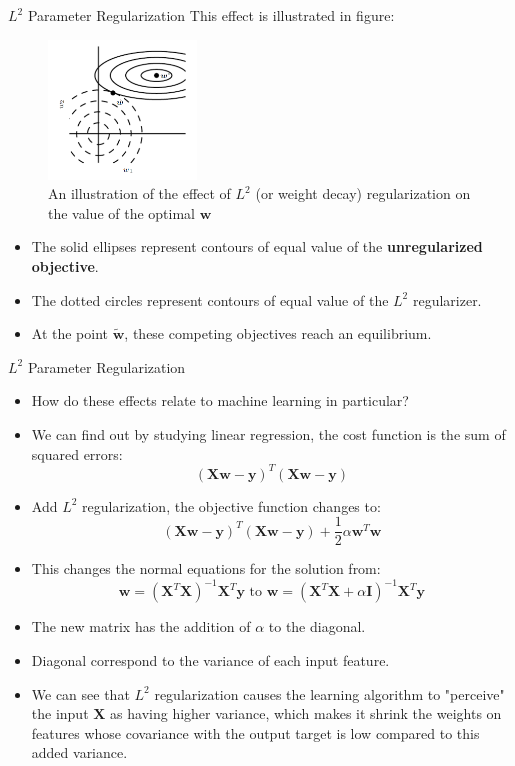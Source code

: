\documentclass[10pt]{beamer}
\begin{document}
	\begin{frame}{$L^2$ Parameter Regularization}
		This effect is illustrated in figure:
		\begin{figure}
			\caption{An illustration of the effect of $L^2$ (or weight decay) regularization on the value of the optimal $\bm{w}$}
			\vspace{-1em}
			\includegraphics[height=10em]{figures/l2-regularization.png}
			\vspace{-1em}
		\end{figure}
		\begin{itemize}
			\pause
			\item The solid ellipses represent contours of equal value of the \textbf{unregularized objective}.
			\pause
			\item The dotted circles represent contours of equal value of the $L^2$ regularizer.
			\pause
			\item At the point $\tilde{\bm{w}}$, these competing objectives reach an equilibrium.
		\end{itemize}
	\end{frame}

	\begin{frame}{$L^2$ Parameter Regularization}
		\begin{itemize}
			\item How do these effects relate to machine learning in particular?
			\pause
			\item We can find out by studying linear regression, the cost function is the sum of squared errors:
			$$(\bm{Xw}-\bm{y})^T(\bm{Xw}-\bm{y})$$
			
			\pause
			\item Add $L^2$ regularization, the objective function changes to:
			$$(\bm{Xw}-\bm{y})^T(\bm{Xw}-\bm{y})+\frac{1}{2}\alpha\bm{w}^T\bm{w}$$
			
			\pause
			\item This changes the normal equations for the solution from:
			$$\bm{w}=(\bm{X}^T\bm{X})^{-1}\bm{X}^T\bm{y} \text{~to~} \bm{w}=(\bm{X}^T\bm{X}+\alpha\bm{I})^{-1}\bm{X}^T\bm{y}$$
			
			\pause
			\item The new matrix has the addition of $\alpha$ to the diagonal.
			\pause
			\item Diagonal correspond to the variance of each input feature.
			\pause
			\item We can see that $L^2$ regularization causes the learning algorithm to "perceive" the input $\bm{X}$ as having higher variance, which makes it shrink the weights on features whose covariance with the output target is low compared to this added variance.
		\end{itemize}
	\end{frame}
\end{document}
